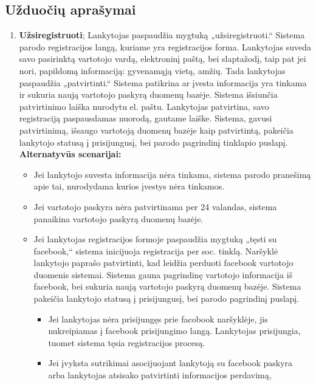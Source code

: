 \documentclass{VUMIFPSkursinis}
\begin{document}
	\subsection{Užduočių aprašymai}
		\begin{enumerate}[label=\textbf{U\arabic*.}]
			\item \textbf{Užsiregistruoti};		%
				Lankytojas paspaudžia mygtuką „užsiregistruoti.“ Sistema parodo registracijos langą, kuriame yra registracijos forma.
				Lankytojas suveda savo pasirinktą vartotojo vardą, elektroninį paštą, bei slaptažodį, taip pat jei nori, 
				papildomą informaciją: gyvenamąją vietą, amžių. Tada lankytojas paspaudžia „patvirtinti.“ 
				Sistema patikrina ar įvesta informacija yra tinkama ir sukuria naują vartotojo paskyrą duomenų bazėje.
				Sistema išsiunčia patvirtinimo laiška nurodytu el. paštu. 
				Lankytojas patvirtina, savo registraciją paspausdamas nuorodą, gautame laiške. Sistema, gavusi patvirtinimą, išsaugo vartotoją duomenų bazėje kaip patvirtintą,
				pakeičia lankytojo statusą į prisijungusį, bei parodo pagrindinį tinklapio puslapį.\\
				\textbf{Alternatyvūs scenarijai:}
				\begin{itemize}
					\item Jei lankytojo suvesta informacija nėra tinkama, sistema parodo pranešimą apie tai, nurodydama kurios įvestys nėra tinkamos.
					\item Jei vartotojo paskyra nėra patvirtinama per 24 valandas, sistema panaikina vartotojo paskyrą duomenų bazėje.
					\item Jei lankytojas registracijos formoje paspaudžia mygtuką „tęsti su facebook,“ sistema inicijuoja registracija per soc. tinklą.
	                    Naršyklė lankytojo paprašo patvirtinti, kad leidžia perduoti facebook vartotojo duomenis sistemai.
						Sistema gauna pagrindinę vartotojo informacija iš facebook, bei sukuria naują vartotojo paskyrą duomenų bazėje.
						Sistema pakeičia lankytojo statusą į prisijungusį, bei parodo pagrindinį puslapį.
						\begin{itemize}
							\item Jei lankytojas nėra prisijungęs prie facobook naršyklėje, jis nukreipiamas į facebook prisijungimo langą. 
								Lankytojas prisijungia, tuomet sistema tęsia registracijos procesą.
							\item Jei įvyksta sutrikimai asocijuojant lankytoją su facebook paskyra arba lankytojas atsisako patvirtinti informacijos perdavimą,

\end{itemize}
\end{itemize}
\end{enumerate}
\end{document}
